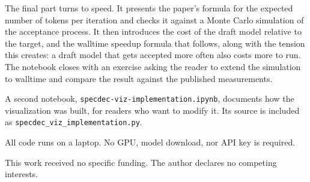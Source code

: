 \documentclass{article}
\begin{document}
The final part turns to speed. It presents the paper's formula for the expected number of tokens per iteration and checks it against a Monte Carlo simulation of the acceptance process. It then introduces the cost of the draft model relative to the target, and the walltime speedup formula that follows, along with the tension this creates: a draft model that gets accepted more often also costs more to run. The notebook closes with an exercise asking the reader to extend the simulation to walltime and compare the result against the published measurements.

A second notebook, \texttt{specdec-viz-implementation.ipynb}, documents how the visualization was built, for readers who want to modify it. Its source is included as \texttt{specdec\_viz\_implementation.py}.

All code runs on a laptop. No GPU, model download, nor API key is required.

\begin{ack}
This work received no specific funding. The author declares no competing interests.
\end{ack}

\medskip


{
\small




}
\end{document}
